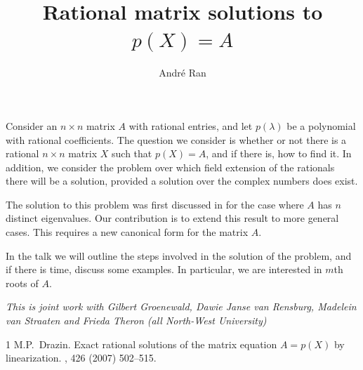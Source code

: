\documentclass[a4paper]{amsart}
\date{}
\begin{document}
\title{Rational matrix solutions to $p(X)=A$}
\author{Andr\'e Ran} %
\address{Vrije Universiteit, The Netherlands and North-West University, South Africa} %

\maketitle

Consider an $n\times n$ matrix $A$ with rational entries, and let $p(\lambda)$ be a polynomial with rational coefficients. The question we consider is whether or not there is a rational $n\times n$ matrix $X$ such that $p(X)=A$, and if there is, how to find it. In addition, we consider the problem over which field extension of the rationals there will be a solution, provided a solution over the complex numbers does exist.

The solution to this problem was first discussed in \cite{Drazin_paper} for the case where $A$ has $n$ distinct eigenvalues. Our contribution is to extend this result to more general cases. This requires a new canonical form for the matrix $A$.

In the talk we will outline the steps involved in the solution of the problem, and if there is time, discuss some examples. In particular, we are interested in $m$th roots of $A$.


\emph{This is joint work with Gilbert Groenewald, Dawie Janse van Rensburg, Madelein van Straaten and Frieda Theron (all North-West University)}

\begin{thebibliography}{1}
M.P.~Drazin. 
\newblock Exact rational solutions of the matrix equation $A=p(X)$ by linearization.
, 426 (2007) 502--515. 
\end{thebibliography}
\end{document}
